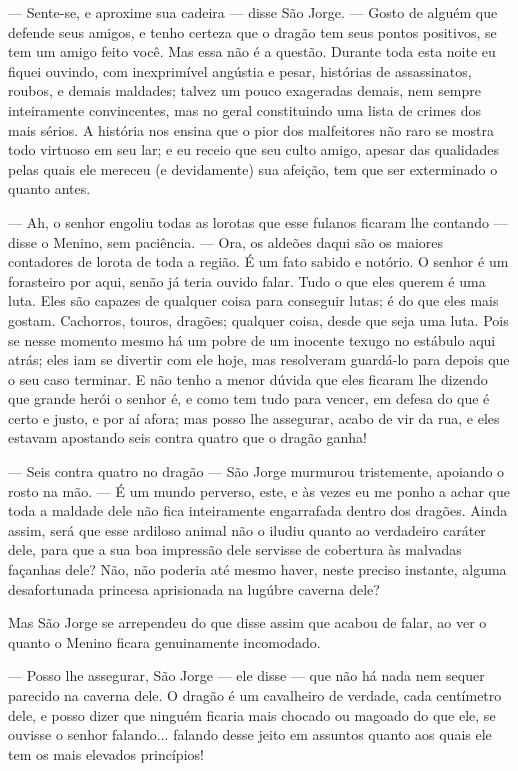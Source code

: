 — Sente-se, e aproxime sua cadeira — disse São Jorge. — Gosto de
alguém que defende seus amigos, e tenho certeza que o dragão tem seus
pontos positivos, se tem um amigo feito você. Mas essa não é a
questão. Durante toda esta noite eu fiquei ouvindo, com inexprimível
angústia e pesar, histórias de assassinatos, roubos, e demais
maldades; talvez um pouco exageradas demais, nem sempre inteiramente
convincentes, mas no geral constituindo uma lista de crimes dos mais
sérios. A história nos ensina que o pior dos malfeitores não raro se
mostra todo virtuoso em seu lar; e eu receio que seu culto amigo,
apesar das qualidades pelas quais ele mereceu (e devidamente) sua
afeição, tem que ser exterminado o quanto antes.

— Ah, o senhor engoliu todas as lorotas que esse fulanos ficaram lhe
contando — disse o Menino, sem paciência. — Ora, os aldeões daqui são
os maiores contadores de lorota de toda a região. É um fato sabido e
notório. O senhor é um forasteiro por aqui, senão já teria ouvido
falar. Tudo o que eles querem é uma luta. Eles são capazes de
qualquer coisa para conseguir lutas; é do que eles mais gostam.
Cachorros, touros, dragões; qualquer coisa, desde que seja uma luta.
Pois se nesse momento mesmo há um pobre de um inocente texugo no
estábulo aqui atrás; eles iam se divertir com ele hoje, mas
resolveram guardá-lo para depois que o seu caso terminar. E não tenho
a menor dúvida que eles ficaram lhe dizendo que grande herói o senhor
é, e como tem tudo para vencer, em defesa do que é certo e justo, e
por aí afora; mas posso lhe assegurar, acabo de vir da rua, e eles
estavam apostando seis contra quatro que o dragão ganha!

— Seis contra quatro no dragão — São Jorge murmurou tristemente,
apoiando o rosto na mão. — É um mundo perverso, este, e às vezes eu
me ponho a achar que toda a maldade dele não fica inteiramente
engarrafada dentro dos dragões. Ainda assim, será que esse ardiloso
animal não o iludiu quanto ao verdadeiro caráter dele, para que a sua
boa impressão dele servisse de cobertura às malvadas façanhas dele?
Não, não poderia até mesmo haver, neste preciso instante, alguma
desafortunada princesa aprisionada na lugúbre caverna dele?

Mas São Jorge se arrependeu do que disse assim que acabou de falar, ao
ver o quanto o Menino ficara genuinamente incomodado.

— Posso lhe assegurar, São Jorge — ele disse — que não há nada nem
sequer parecido na caverna dele. O dragão é um cavalheiro de verdade,
cada centímetro dele, e posso dizer que ninguém ficaria mais chocado
ou magoado do que ele, se ouvisse o senhor falando... falando desse
jeito em assuntos quanto aos quais ele tem os mais elevados
princípios!

